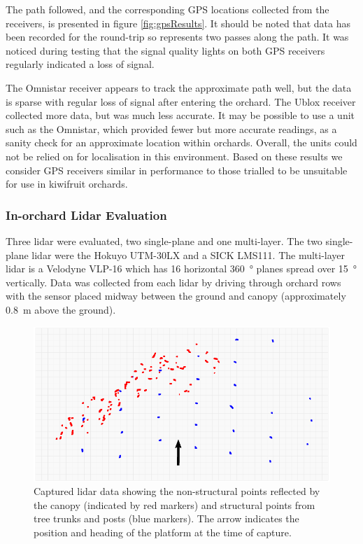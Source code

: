 \documentclass[preprint,authoryear,12pt]{elsarticle}
\begin{document}
        The path followed, and the corresponding GPS locations collected from the receivers, is presented in figure \ref{fig:gpsResults}.
        It should be noted that data has been recorded for the round-trip so represents two passes along the path.
        It was noticed during testing that the signal quality lights on both GPS receivers regularly indicated a loss of signal.

        The Omnistar receiver appears to track the approximate path well, but the data is sparse with regular loss of signal after entering the orchard.
    	The Ublox receiver collected more data, but was much less accurate.
        It may be possible to use a unit such as the Omnistar, which provided fewer but more accurate readings, as a sanity check for an approximate location within orchards.
        Overall, the units could not be relied on for localisation in this environment.
        Based on these results we consider GPS receivers similar in performance to those trialled to be unsuitable for use in kiwifruit orchards.

    \subsubsection{In-orchard Lidar Evaluation}
        Three lidar were evaluated, two single-plane and one multi-layer.
        The two single-plane lidar were the Hokuyo UTM-30LX and a SICK LMS111.
        The multi-layer lidar is a Velodyne VLP-16 which has 16 horizontal \SI{360}{\degree} planes spread over \SI{15}{\degree} vertically.
        Data was collected from each lidar by driving through orchard rows with the sensor placed midway between the ground and canopy (approximately \SI{0.8}{\meter} above the ground).

        \begin{figure}[htb]
            \centering
            \includegraphics[width=\linewidth]{imgs/canopy_data/canopy_data.pdf}
            \caption{
                Captured lidar data showing the non-structural points reflected by the canopy (indicated by red markers) and structural points from tree trunks and posts (blue markers).
                The arrow indicates the position and heading of the platform at the time of capture.
            }
            \label{fig:canopyDataCloud}
        \end{figure}
\end{document}
